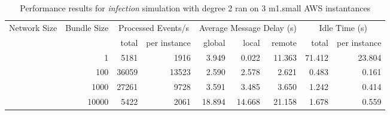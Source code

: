 \begin{table}
	  \caption[Performance results, \emph{infection:2 on 3 m1.small instances }]{ Performance results for \emph{ infection } simulation with degree 2 ran on 3 m1.small AWS instantances }
	\begin{tabular}{rrrrrrrrr}
	\hline\noalign{\smallskip}

	Network Size &
	Bundle Size &
	\multicolumn{2}{c}{Processed Events/s} & 
	\multicolumn{3}{c}{Average Message Delay (s)} & 
	\multicolumn{2}{c}{Idle Time (s)}  \\

	 & 
	 & 
	 total & per instance
     & global & local & remote
     & total & per instance\\

			
				\noalign{\smallskip}\hline
				\multirow{ 4 }{*}{ 40000 } &
				
					
					 
					\multirow{ 1 }{*}{ 1 } &
					
						
							    
							     5181  & 1916  
	                           & 3.949 & 0.022 & 11.363
	                           & 71.412 & 23.804  \\
	                
	            
					 &  
					 
					\multirow{ 1 }{*}{ 100 } &
					
						
							    
							     36059  & 13523  
	                           & 2.590 & 2.578 & 2.621
	                           & 0.483 & 0.161  \\
	                
	            
					 &  
					 
					\multirow{ 1 }{*}{ 1000 } &
					
						
							    
							     27261  & 9728  
	                           & 3.591 & 3.485 & 3.650
	                           & 1.242 & 0.414  \\
	                
	            
					 &  
					 
					\multirow{ 1 }{*}{ 10000 } &
					
						
							    
							     5422  & 2061  
	                           & 18.894 & 14.668 & 21.158
	                           & 1.678 & 0.559  \\
	                

\end{tabular}
\end{table}
